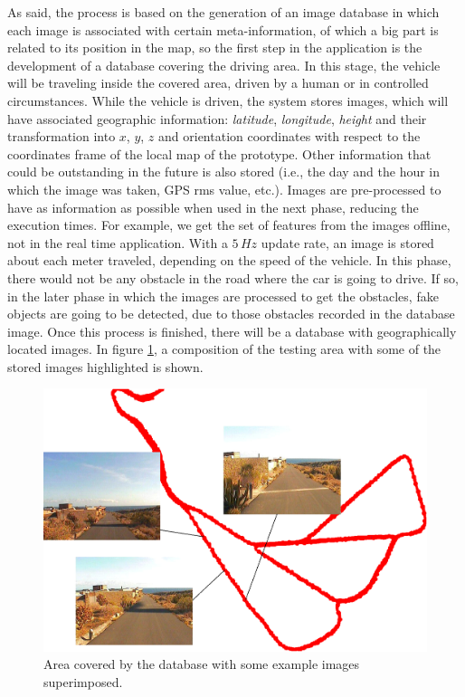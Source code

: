 As said, the process is based on the generation of an image database in which each image is associated with certain meta-information, of which a big part is related to its position in the map, so the first step in the application is the development of a database covering the driving area. In this stage, the vehicle will be traveling inside the covered area, driven by a human or in controlled circumstances. While the vehicle is driven, the system stores images, which will have associated geographic information: \emph{latitude}, \emph{longitude}, \emph{height} and their transformation into $x$, $y$, $z$ and orientation coordinates with respect to the coordinates frame of the local map of the prototype. Other information that could be outstanding in the future is also stored (i.e., the day and the hour in which the image was taken, GPS rms value, etc.). Images are pre-processed to have as information as possible when used in the next phase, reducing the execution times. For example, we get the set of features from the images offline, not in the real time application. With a $5\,Hz$ update rate, an image is stored about each meter traveled, depending on the speed of the vehicle. In this phase, there would not be any obstacle in the road where the car is going to drive. If so, in the later phase in which the images are processed to get the obstacles, fake objects are going to be detected, due to those obstacles recorded in the database image. Once this process is finished, there will be a database with geographically located images. In figure \ref{fig:cp02_image_database}, a composition of the testing area with some of the stored images highlighted is shown.

\begin{figure}[thb]
  \centering
  \includegraphics{database}
  \caption{Area covered by the database with some example images superimposed.}
  \label{fig:cp02_image_database}
\end{figure}

